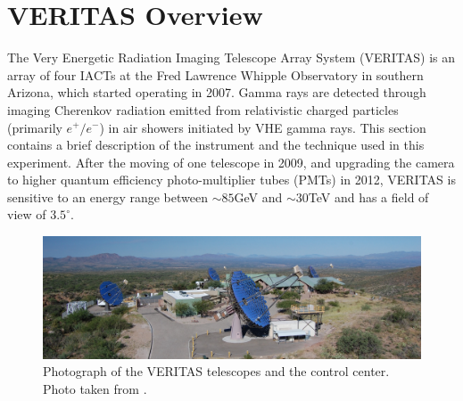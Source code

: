 \documentclass[main.tex]{subfiles}
\begin{document}
\section{VERITAS Overview}
The Very Energetic Radiation Imaging Telescope Array System (VERITAS) is an array of four IACTs at the Fred Lawrence Whipple Observatory in southern Arizona, which started operating in 2007. Gamma rays are detected through imaging Cherenkov radiation emitted from relativistic charged particles (primarily $e^+/e^-$) in air showers initiated by VHE gamma rays. This section contains a brief description of the instrument and the technique used in this experiment. After the moving of one telescope in 2009, and upgrading the camera to higher quantum efficiency photo-multiplier tubes (PMTs) in 2012, VERITAS is sensitive to an energy range between $\sim85$GeV and $\sim30$TeV and has a field of view of $3.5^\circ$.
\begin{figure}[htbp]
  \centering
  \includegraphics[width=\linewidth]{images/veritas_standard}
  \caption[Photograph of the VERITAS telescopes and the control center.]{Photograph of the VERITAS telescopes and the control center. Photo taken from \cite{veritas_web}.}
  \label{veritas_standard}
\end{figure}
\end{document}
